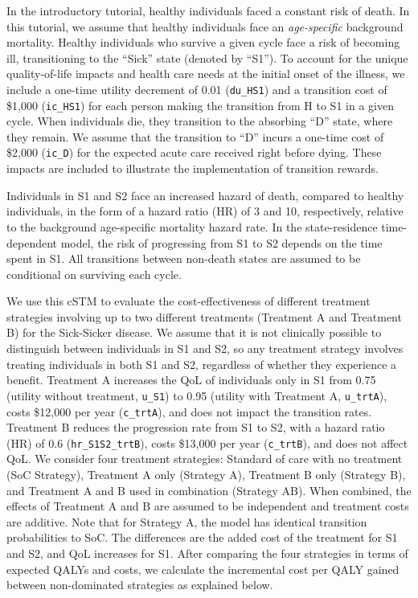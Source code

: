 \documentclass[
]{article}
\begin{document}
In the introductory tutorial, healthy individuals faced a constant risk of death. In this tutorial, we assume that healthy individuals face an \emph{age-specific} background mortality. Healthy individuals who survive a given cycle face a risk of becoming ill, transitioning to the ``Sick'' state (denoted by ``S1''). To account for the unique quality-of-life impacts and health care needs at the initial onset of the illness, we include a one-time utility decrement of 0.01 (\texttt{du\_HS1}) and a transition cost of \$1,000 (\texttt{ic\_HS1}) for each person making the transition from H to S1 in a given cycle. When individuals die, they transition to the absorbing ``D'' state, where they remain. We assume that the transition to ``D'' incurs a one-time cost of \$2,000 (\texttt{ic\_D}) for the expected acute care received right before dying. These impacts are included to illustrate the implementation of transition rewards.

Individuals in S1 and S2 face an increased hazard of death, compared to healthy individuals, in the form of a hazard ratio (HR) of 3 and 10, respectively, relative to the background age-specific mortality hazard rate. In the state-residence time-dependent model, the risk of progressing from S1 to S2 depends on the time spent in S1. All transitions between non-death states are assumed to be conditional on surviving each cycle.

We use this cSTM to evaluate the cost-effectiveness of different treatment strategies involving up to two different treatments (Treatment A and Treatment B) for the Sick-Sicker disease. We assume that it is not clinically possible to distinguish between individuals in S1 and S2, so any treatment strategy involves treating individuals in both S1 and S2, regardless of whether they experience a benefit. Treatment A increases the QoL of individuals only in S1 from 0.75 (utility without treatment, \texttt{u\_S1}) to 0.95 (utility with Treatment A, \texttt{u\_trtA}), costs \$12,000 per year (\texttt{c\_trtA}), and does not impact the transition rates. Treatment B reduces the progression rate from S1 to S2, with a hazard ratio (HR) of 0.6 (\texttt{hr\_S1S2\_trtB}), costs \$13,000 per year (\texttt{c\_trtB}), and does not affect QoL. We consider four treatment strategies: Standard of care with no treatment (SoC Strategy), Treatment A only (Strategy A), Treatment B only (Strategy B), and Treatment A and B used in combination (Strategy AB). When combined, the effects of Treatment A and B are assumed to be independent and treatment costs are additive. Note that for Strategy A, the model has identical transition probabilities to SoC. The differences are the added cost of the treatment for S1 and S2, and QoL increases for S1. After comparing the four strategies in terms of expected QALYs and costs, we calculate the incremental cost per QALY gained between non-dominated strategies as explained below.
\end{document}
